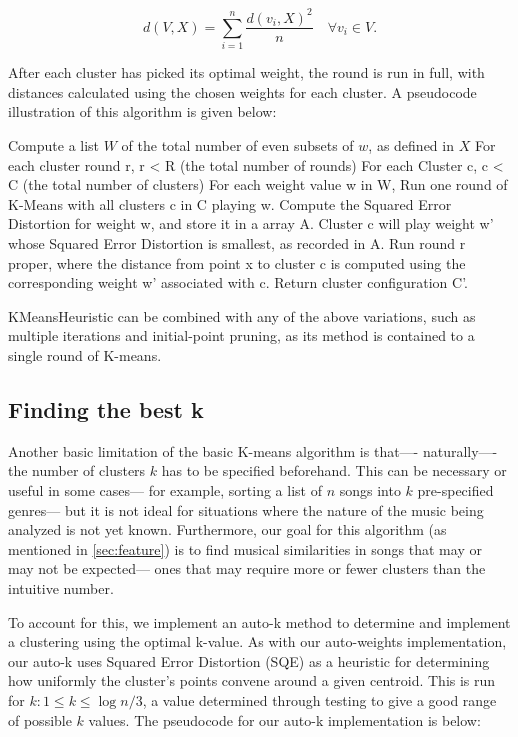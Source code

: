 \documentclass[10pt,twocolumn]{article}
\begin{document}
$$
d(V,X) = \sum_{i=1}^{n} \frac{d(v_i, X)^2}{n} \quad \forall v_i \in V.
$$

After each cluster has picked its optimal weight, the round is run in full, with distances calculated using the chosen weights for each cluster. A pseudocode illustration of this algorithm is given below:

Compute a list $W$ of the total number of even subsets of $w$, as defined in $X$
For each cluster round r, r < R (the total number of rounds)
	For each Cluster c, c < C (the total number of clusters)
		For each weight value w in W,
Run one round of K-Means with all clusters c in C playing w.
Compute the Squared Error Distortion for weight w, and store it in a array A. 
Cluster c will play weight w’ whose Squared Error Distortion is smallest, as recorded in A.
Run round r proper, where the distance from point x to cluster c is computed using the corresponding weight w’ associated with c.
Return cluster configuration C’.


KMeansHeuristic can be combined with any of the above variations, such as multiple iterations and initial-point pruning, as its method is contained to a single round of K-means.

\subsection{Finding the best k}

Another basic limitation of the basic K-means algorithm is that—- naturally—- the number of clusters $k$ has to be specified beforehand. This can be necessary or useful in some cases— for example, sorting a list of $n$ songs into $k$ pre-specified genres— but it is not ideal for situations where the nature of the music being analyzed is not yet known. Furthermore, our goal for this algorithm (as mentioned in \ref{sec:feature}) is to find musical similarities in songs that may or may not be expected— ones that may require more or fewer clusters than the intuitive number. 


To account for this, we implement an auto-k method to determine and implement a clustering using the optimal k-value. As with our auto-weights implementation, our auto-k uses Squared Error Distortion (SQE) as a heuristic for determining how uniformly the cluster’s points convene around a given centroid. This is run for $k: 1 \leq k \leq \log{n} / 3$, a value determined through testing to give a good range of possible $k$ values. The pseudocode for our auto-k implementation is below: 
\end{document}
